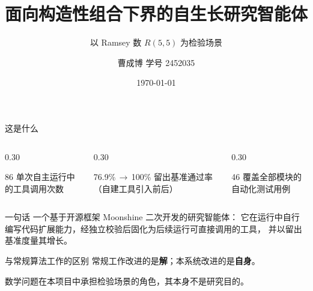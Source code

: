 \documentclass[aspectratio=169,11pt]{beamer}
\title[自生长研究智能体]{面向构造性组合下界的自生长研究智能体}
\subtitle{以 Ramsey 数 \texorpdfstring{$R(5,5)$}{R(5,5)} 为检验场景}
\author[曹成博]{曹成博 \quad 学号 2452035}
\institute{人工智能选修课}
\date{\today}
\newcommand{\key}[1]{\textbf{\color{accent}#1}}
\begin{document}
\begin{frame}
  \titlepage
\end{frame}

\begin{frame}{这是什么}
  \begin{columns}[T,onlytextwidth]
    \begin{column}{0.30\textwidth}
      \begin{block}{86}
        \centering
        单次自主运行中\\的工具调用次数
      \end{block}
    \end{column}
    \begin{column}{0.30\textwidth}
      \begin{block}{76.9\%\,$\rightarrow$\,100\%}
        \centering
        留出基准通过率\\（自建工具引入前后）
      \end{block}
    \end{column}
    \begin{column}{0.30\textwidth}
      \begin{block}{46}
        \centering
        覆盖全部模块的\\自动化测试用例
      \end{block}
    \end{column}
  \end{columns}

  \vspace{0.7em}
  \begin{block}{一句话}
    一个基于开源框架 Moonshine 二次开发的研究智能体：
    它在运行中自行编写代码扩展能力，经独立校验后固化为后续运行可直接调用的工具，
    并以留出基准度量其增长。
  \end{block}

  \vspace{0.4em}
  \begin{alertblock}{与常规算法工作的区别}
    \centering
    常规工作改进的是\key{解}；本系统改进的是\key{自身}。
  \end{alertblock}

  \vspace{0.3em}
  \footnotesize\color{black!65}
  数学问题在本项目中承担检验场景的角色，其本身不是研究目的。
\end{frame}
\end{document}
